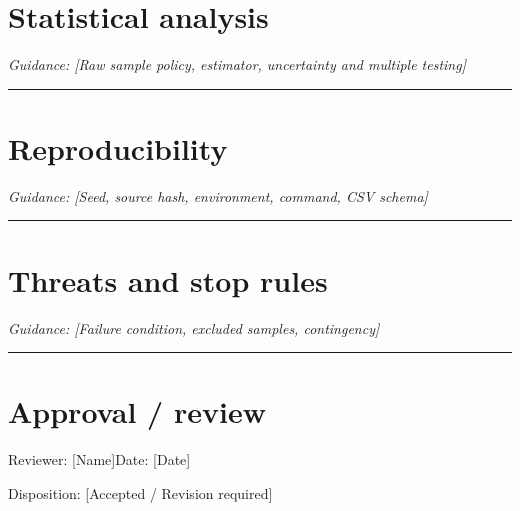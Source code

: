 \documentclass[11pt]{article}
\begin{document}
\section{Statistical analysis}
\noindent\textit{Guidance: [Raw sample policy, estimator, uncertainty and multiple testing]}\par\vspace{0.9cm}\hrule\vspace{0.25cm}
\section{Reproducibility}
\noindent\textit{Guidance: [Seed, source hash, environment, command, CSV schema]}\par\vspace{0.9cm}\hrule\vspace{0.25cm}
\section{Threats and stop rules}
\noindent\textit{Guidance: [Failure condition, excluded samples, contingency]}\par\vspace{0.9cm}\hrule\vspace{0.25cm}
\section{Approval / review}
\noindent Reviewer: [Name]\quad Date: [Date]\par
\noindent Disposition: [Accepted / Revision required]\par\vspace{0.4cm}
\end{document}
